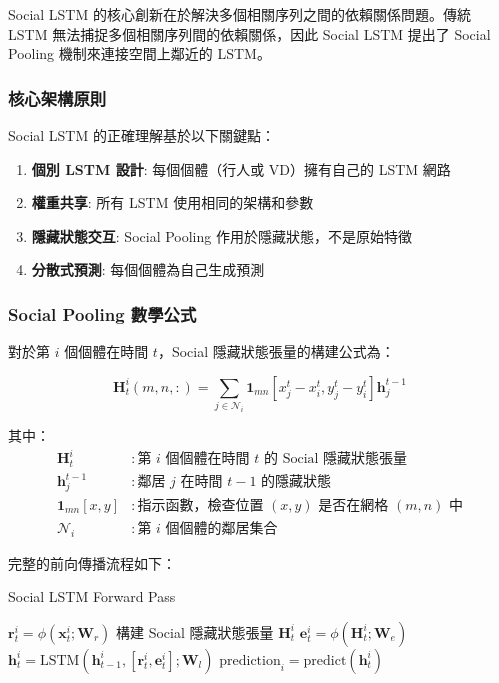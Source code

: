 \documentclass[11pt,a4paper]{article}
\begin{document}
Social LSTM \cite{alahi2016social} 的核心創新在於解決多個相關序列之間的依賴關係問題。傳統 LSTM 無法捕捉多個相關序列間的依賴關係，因此 Social LSTM 提出了 Social Pooling 機制來連接空間上鄰近的 LSTM。

\subsubsection{核心架構原則}

Social LSTM 的正確理解基於以下關鍵點：

\begin{enumerate}
\item \textbf{個別 LSTM 設計}: 每個個體（行人或 VD）擁有自己的 LSTM 網路
\item \textbf{權重共享}: 所有 LSTM 使用相同的架構和參數
\item \textbf{隱藏狀態交互}: Social Pooling 作用於隱藏狀態，不是原始特徵
\item \textbf{分散式預測}: 每個個體為自己生成預測
\end{enumerate}

\subsubsection{Social Pooling 數學公式}

對於第 $i$ 個個體在時間 $t$，Social 隱藏狀態張量的構建公式為：

\begin{equation}
\mathbf{H}_t^i(m,n,:) = \sum_{j \in \mathcal{N}_i} \mathbf{1}_{mn}[x_j^t - x_i^t, y_j^t - y_i^t] \mathbf{h}_j^{t-1}
\end{equation}

其中：
\begin{align}
\mathbf{H}_t^i &: \text{第 } i \text{ 個個體在時間 } t \text{ 的 Social 隱藏狀態張量} \\
\mathbf{h}_j^{t-1} &: \text{鄰居 } j \text{ 在時間 } t-1 \text{ 的隱藏狀態} \\
\mathbf{1}_{mn}[x,y] &: \text{指示函數，檢查位置 } (x,y) \text{ 是否在網格 } (m,n) \text{ 中} \\
\mathcal{N}_i &: \text{第 } i \text{ 個個體的鄰居集合}
\end{align}

完整的前向傳播流程如下：

\begin{algorithm}
\caption{Social LSTM Forward Pass}
\begin{algorithmic}
    \STATE $\mathbf{r}_t^i = \phi(\mathbf{x}_t^i; \mathbf{W}_r)$ 
\ENDFOR
{}
    \STATE 構建 Social 隱藏狀態張量 $\mathbf{H}_t^i$
    \STATE $\mathbf{e}_t^i = \phi(\mathbf{H}_t^i; \mathbf{W}_e)$ 
    \STATE $\mathbf{h}_t^i = \text{LSTM}(\mathbf{h}_{t-1}^i, [\mathbf{r}_t^i, \mathbf{e}_t^i]; \mathbf{W}_l)$
\ENDFOR
{}
    \STATE $\text{prediction}_i = \text{predict}(\mathbf{h}_t^i)$ 
\ENDFOR
\end{algorithmic}
\end{algorithm}
\end{document}
